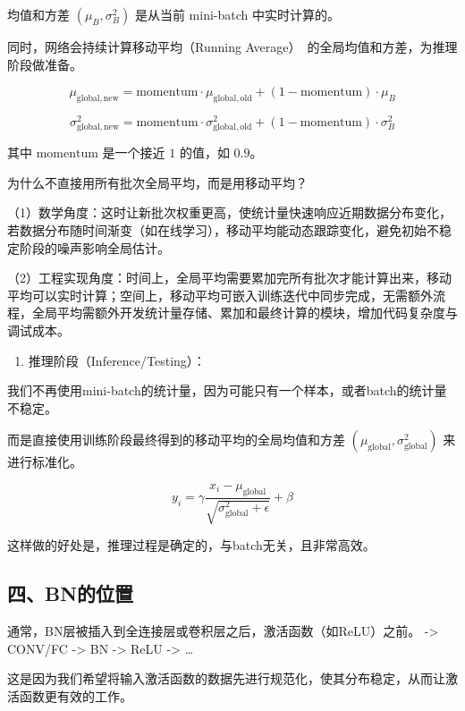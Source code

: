 均值和方差 \((\mu_B,\sigma_B^2)\) 是从当前 mini-batch 中实时计算的。

同时，网络会持续计算移动平均（Running Average）~的全局均值和方差，为推理阶段做准备。

\[
\mu_{\mathrm{global,new}}
= \mathrm{momentum}\cdot\mu_{\mathrm{global,old}}
+ (1-\mathrm{momentum})\cdot\mu_B
\]

\[
\sigma_{\mathrm{global,new}}^2
= \mathrm{momentum}\cdot\sigma_{\mathrm{global,old}}^2
+ (1-\mathrm{momentum})\cdot\sigma_B^2
\]

其中 \(\mathrm{momentum}\) 是一个接近 \(1\) 的值，如 \(0.9\)。

为什么不直接用所有批次全局平均，而是用移动平均？

（1）数学角度：这时让新批次权重更高，使统计量快速响应近期数据分布变化，若数据分布随时间渐变（如在线学习），移动平均能动态跟踪变化，避免初始不稳定阶段的噪声影响全局估计。

（2）工程实现角度：时间上，全局平均需要累加完所有批次才能计算出来，移动平均可以实时计算；空间上，移动平均可嵌入训练迭代中同步完成，无需额外流程，全局平均需额外开发统计量存储、累加和最终计算的模块，增加代码复杂度与调试成本。

\begin{enumerate}
\def\labelenumi{\arabic{enumi}.}
\setcounter{enumi}{1}
\tightlist
\item
  推理阶段（Inference/Testing）：
\end{enumerate}

我们不再使用mini-batch的统计量，因为可能只有一个样本，或者batch的统计量不稳定。

而是直接使用训练阶段最终得到的移动平均的全局均值和方差 \((\mu_{\text{global}},\sigma_{\text{global}}^2)\) 来进行标准化。

\[
y_i=\gamma\frac{x_i-\mu_{\text{global}}}{\sqrt{\sigma_{\text{global}}^2+\epsilon}}+\beta
\]

这样做的好处是，推理过程是确定的，与batch无关，且非常高效。

\hypertarget{ux56dbbnux7684ux4f4dux7f6e}{%
\subsection{四、BN的位置}\label{ux56dbbnux7684ux4f4dux7f6e}}

通常，BN层被插入到全连接层或卷积层之后，激活函数（如ReLU）之前。
-\textgreater{} CONV/FC -\textgreater{} BN -\textgreater{} ReLU -\textgreater{} \ldots{}

这是因为我们希望将输入激活函数的数据先进行规范化，使其分布稳定，从而让激活函数更有效的工作。

